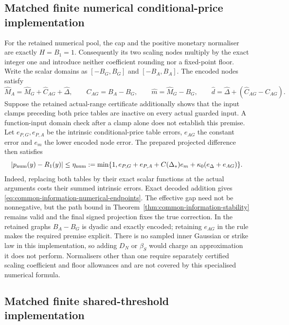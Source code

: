 \documentclass[11pt]{article}
\begin{document}
\subsection{Matched finite numerical conditional-price implementation}

For the retained numerical pool, the cap and the positive monetary
normaliser are exactly $H=B_1=1$. Consequently its two scaling nodes
multiply by the exact integer one and introduce neither coefficient
rounding nor a fixed-point floor. Write the scalar domains as
$[-B_G,B_G]$ and $[-B_A,B_A]$. The encoded nodes satisfy
\begin{equation}
 \widehat M_A=\widehat M_G+\widehat C_{AG}+\widehat\Delta,\qquad
 C_{AG}=B_A-B_G,\qquad
 \widehat m=\widehat M_G-B_G,\qquad
 \widehat d=\widehat\Delta+(\widehat C_{AG}-C_{AG}).
 \label{eq:common-information-numerical-endpoints}
\end{equation}
Suppose the retained actual-range certificate additionally shows that
the input clamps preceding both price tables are inactive on every
actual guarded input. A function-input domain check after a clamp alone
does not establish this premise. Let $e_{P,G},e_{P,A}$ be the intrinsic
conditional-price table errors, $e_{AG}$ the constant error and $e_m$
the lower encoded node error. The prepared projected difference then
satisfies
\begin{equation}
 |p_{\rm num}(y)-R_1(y)|\leq\eta_{\rm num}:=
 \min\{1,e_{P,G}+e_{P,A}+C(\Delta_*)e_m
                             +\kappa_0(e_\Delta+e_{AG})\}.
 \label{eq:common-information-numerical-bound}
\end{equation}
Indeed, replacing both tables by their exact scalar functions at the
actual arguments costs their summed intrinsic errors. Exact decoded
addition gives \eqref{eq:common-information-numerical-endpoints}.
The effective gap need not be nonnegative, but the path bound in
Theorem~\ref{thm:common-information-stability} remains valid and the
final signed projection fixes the true correction. In the retained
graphs $B_A-B_G$ is dyadic and exactly encoded; retaining $e_{AG}$ in
the rule makes the required premise explicit. There is no sampled
inner Gaussian or strike law in this implementation, so adding $D_N$
or $\beta_S$ would charge an approximation it does not perform.
Normalisers other than one require separately certified scaling
coefficient and floor allowances and are not covered by this specialised
numerical formula.

\subsection{Matched finite shared-threshold implementation}
\end{document}
